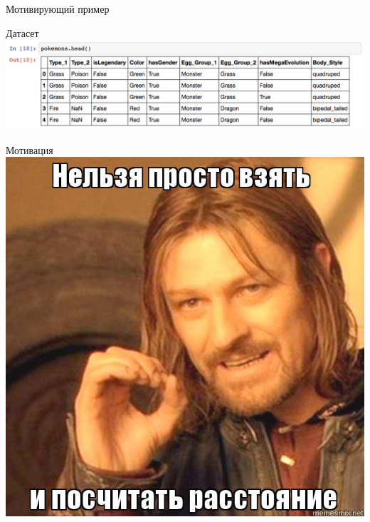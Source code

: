 \documentclass[10pt]{beamer}
\begin{document}
{\begin{frame}{Мотивирующий пример}
\begin{figure}
	    \qquad 
	    \qquad
	    \qquad
	\end{figure}
\end{frame}
}

\begin{frame}{Датасет}
    \centering
	\includegraphics[width=\textwidth]{images/pokemons}
\end{frame}

\begin{frame}{Мотивация}
    \centering
	\includegraphics[width=\textwidth, height=0.8 \textheight, keepaspectratio]{images/distance}
\end{frame}
\end{document}
